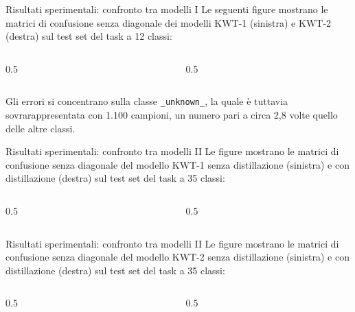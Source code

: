 \documentclass[aspectratio=169]{beamer}
\begin{document}
\begin{frame}{Risultati sperimentali: confronto tra modelli I}
  Le seguenti figure mostrano le matrici di confusione senza diagonale dei modelli KWT-1 (sinistra) e KWT-2 (destra) sul test set del task a 12 classi:
  \vspace{0.4em}
  \begin{columns}[c]
    \begin{column}{0.5\textwidth}
      \centering
      
    \end{column}
    \begin{column}{0.5\textwidth}
      \centering
      
    \end{column}
  \end{columns}
  \vspace{0.4em}
  Gli errori si concentrano sulla classe \texttt{\_unknown\_}, la quale è tuttavia sovrarappresentata con 1.100 campioni, un numero pari a circa 2,8 volte quello delle altre classi.
\end{frame}

\begin{frame}{Risultati sperimentali: confronto tra modelli II}
  Le figure mostrano le matrici di confusione senza diagonale del modello KWT-1 senza distillazione (sinistra) e con distillazione (destra) sul test set del task a 35 classi:
  \vspace{0.4em}
  \begin{columns}[c]
    \begin{column}{0.5\textwidth}
      \centering
      
    \end{column}
    \begin{column}{0.5\textwidth}
      \centering
      
    \end{column}
  \end{columns}
\end{frame}

\begin{frame}{Risultati sperimentali: confronto tra modelli II}
  Le figure mostrano le matrici di confusione senza diagonale del modello KWT-2 senza distillazione (sinistra) e con distillazione (destra) sul test set del task a 35 classi:
  \vspace{0.4em}
  \begin{columns}[c]
    \begin{column}{0.5\textwidth}
      \centering
      
    \end{column}
    \begin{column}{0.5\textwidth}
      \centering
      
    \end{column}
  \end{columns}
\end{frame}
\end{document}
